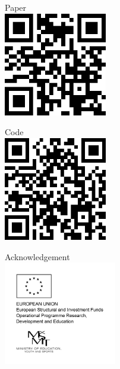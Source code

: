 \documentclass[30pt]{tikzposter}
\begin{document}
\begin{columns}
\begin{subcolumns}
{      \vspace{0.5cm}
        \begin{minipage}{0.05\textwidth}
          \centering
          Paper\\
          \vspace{0.3cm}
          \includegraphics[height=4.5cm]{qr-paper.png}
        \end{minipage}
        \hspace{2cm}
        \begin{minipage}{0.05\textwidth}
          \centering
          Code\\
          \vspace{0.3cm}
          \includegraphics[height=4.5cm]{qr-code.png}
        \end{minipage}
        \hspace{2cm}
        \begin{minipage}{0.05\textwidth}
          \centering
          Acknowledgement\\
          \vspace{0.3cm}
          \includegraphics[height=4.5cm]{rci.jpg}
        \end{minipage}
      \vspace{0.5cm}

}
\end{subcolumns}
\end{columns}
\end{document}
